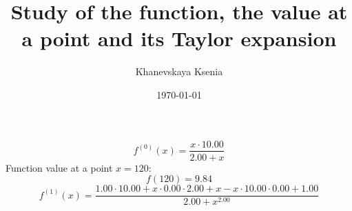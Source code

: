 \documentclass[12pt, letterpaper]{article}
\title {Study of the function, the value at a point and its Taylor expansion}
\author{Khanevskaya Ksenia}
\date{\today}
\begin{document}
\maketitle
\[f^{(0)}(x)=\frac{x\cdot10.00}{2.00+x}\]
Function value at a point $x=120$: \[f(120)=9.84\]
\[f^{(1)}(x)=\frac{1.00\cdot10.00+x\cdot0.00\cdot2.00+x-x\cdot10.00\cdot0.00+1.00}{2.00+x^{2.00}}\]
\end{document}
